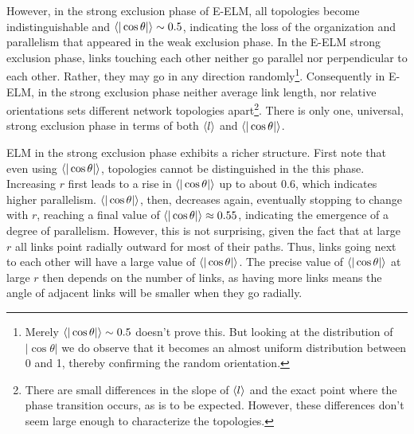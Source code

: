 \documentclass[nofootinbib,preprint,floatfix]{revtex4} %
\begin{document}
However, in the strong exclusion phase of E-ELM, all topologies become indistinguishable and $\be{|\cos\theta|} \sim 0.5 $, indicating the loss of the organization and parallelism that appeared in the weak exclusion phase. 
In the E-ELM strong exclusion phase, links touching each other neither go parallel nor perpendicular to each other.
Rather, they may go in any direction randomly\footnote{Merely  $\be{|\cos\theta|} \sim 0.5 $ doesn't prove this. But looking at the distribution of $|\cos\theta|$ we do observe that it becomes an almost uniform distribution between 0 and 1, thereby confirming the random orientation.}. 
Consequently in E-ELM, %
in the strong exclusion phase %
neither average link length, nor relative orientations sets different network topologies apart\footnote{
There are small differences in the slope of $\left<l\right>$ and the exact point where the phase transition occurs, as is to be expected.
However, these differences don't seem large enough to characterize the topologies.}. 
There is only one, universal, strong exclusion phase in terms of both $\left<l\right>$ and $\be{|\cos\theta|}$. 

ELM in the strong exclusion phase exhibits a richer structure. 
First note that even using $\be{|\cos\theta|} $, topologies cannot be distinguished in the this phase. 
Increasing $r$ first leads to a rise in $\be{|\cos\theta|} $ up to about $0.6$, which indicates higher parallelism. 
$\be{|\cos\theta|}$, then, decreases again, eventually stopping to change with $r$, reaching a final value of $\be{|\cos\theta|} \approx 0.55 $, indicating the emergence of a degree of parallelism. 
However, this is not surprising, given the fact that at large $r$ all links point radially outward for most of their paths. Thus, links going next to each other will have a large value of  $\be{|\cos\theta|}$. The precise value of $\be{|\cos\theta|}$ at large $r$ then depends on the number of links, as having more links means the angle of adjacent links will be smaller when they go radially. 
\end{document}
